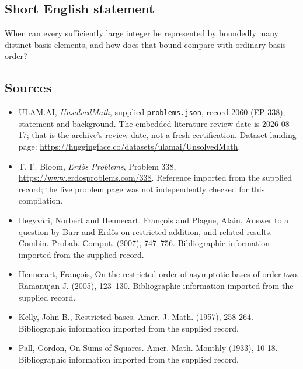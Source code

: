 \documentclass[11pt,a4paper]{article}
\begin{document}
\subsection{Short English statement}

When can every sufficiently large integer be represented by boundedly many distinct basis elements, and how does that bound compare with ordinary basis order?

\subsection{Sources}

{\small

\begin{itemize}

\item[\hypertarget{source:2060:1}{S1}] ULAM.AI, \emph{UnsolvedMath}, supplied \texttt{problems.json}, record 2060 (EP-338), statement and background. The embedded literature-review date is 2026-08-17; that is the archive’s review date, not a fresh certification. Dataset landing page: \url{https://huggingface.co/datasets/ulamai/UnsolvedMath}.

\item[\hypertarget{source:2060:2}{S2}] T. F. Bloom, \emph{Erdős Problems}, Problem 338, \url{https://www.erdosproblems.com/338}. Reference imported from the supplied record; the live problem page was not independently checked for this compilation.

\item[\hypertarget{source:2060:3}{S3}] Hegyv\'ari, Norbert and Hennecart, Fran\c cois and Plagne, Alain, Answer to a question by {B}urr and {E}rd\H{o}s on restricted addition, and related results. Combin. Probab. Comput. (2007), 747--756. Bibliographic information imported from the supplied record.

\item[\hypertarget{source:2060:4}{S4}] Hennecart, Fran\c cois, On the restricted order of asymptotic bases of order two. Ramanujan J. (2005), 123--130. Bibliographic information imported from the supplied record.

\item[\hypertarget{source:2060:5}{S5}] Kelly, John B., Restricted bases. Amer. J. Math. (1957), 258-264. Bibliographic information imported from the supplied record.

\item[\hypertarget{source:2060:6}{S6}] Pall, Gordon, On Sums of Squares. Amer. Math. Monthly (1933), 10-18. Bibliographic information imported from the supplied record.

\end{itemize}

}

\label{end:2060}
\end{document}
